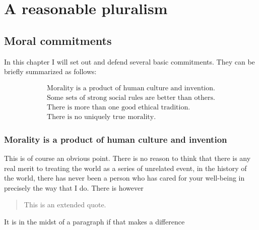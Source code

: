 


\chapter{A reasonable pluralism}\label{ch:pluralism}
\section{Moral commitments}

In this chapter I will set out and defend several basic commitments.
They can be briefly summarized as follows:

\begin{align}
  \text{Morality is a product of human culture and invention}.\\
  \text{Some sets of strong social rules are better than others}.\\
  \text{There is more than one good ethical tradition}.\\
  \text{There is no uniquely true morality}.
\end{align}

\subsection{Morality is a product of human culture and invention}
This is of course an obvious point. There is no reason to think that there is
any real merit to treating the world as a series of unrelated event, in the
history of the world, there has never been a person who has cared for your
well-being in precisely the way that I do. There is however \autocite{pinheirowallakantmoral2015}
\begin{quote}
This is an extended quote.
\end{quote}
It is in the midst of a paragraph if that makes a difference

